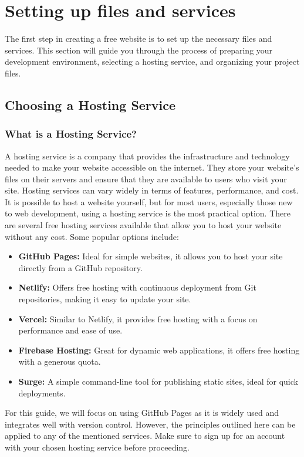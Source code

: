 \section{Setting up files and services}

The first step in creating a free website is to set up the necessary files and services. This section will guide you through the process of preparing your development environment, selecting a hosting service, and organizing your project files.

\subsection{Choosing a Hosting Service}

\subsubsection{What is a Hosting Service?}
A hosting service is a company that provides the infrastructure and technology needed to make your website accessible on the internet. They store your website's files on their servers and ensure that they are available to users who visit your site. Hosting services can vary widely in terms of features, performance, and cost. It is possible to host a website yourself, but for most users, especially those new to web development, using a hosting service is the most practical option. There are several free hosting services available that allow you to host your website without any cost. Some popular options include:
\begin{itemize}
    \item \textbf{GitHub Pages:} Ideal for simple websites, it allows you to host your site directly from a GitHub repository.
    \item \textbf{Netlify:} Offers free hosting with continuous deployment from Git repositories, making it easy to update your site.
    \item \textbf{Vercel:} Similar to Netlify, it provides free hosting with a focus on performance and ease of use.
    \item \textbf{Firebase Hosting:} Great for dynamic web applications, it offers free hosting with a generous quota.
    \item \textbf{Surge:} A simple command-line tool for publishing static sites, ideal for quick deployments.
\end{itemize}

For this guide, we will focus on using GitHub Pages as it is widely used and integrates well with version control. However, the principles outlined here can be applied to any of the mentioned services. Make sure to sign up for an account with your chosen hosting service before proceeding.

